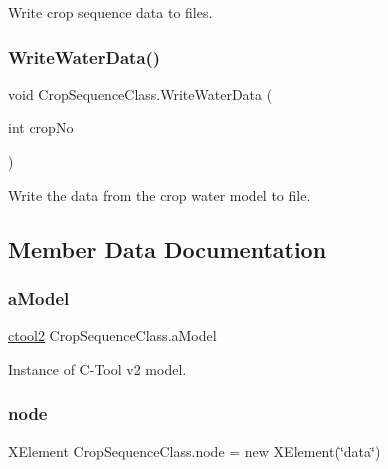 Write crop sequence data to files. 

\mbox{\label{class_crop_sequence_class_a51e6061d67d1d2a167fb2c3ae9ea843c}} 
\subsubsection{\texorpdfstring{WriteWaterData()}{WriteWaterData()}}
{\footnotesize\ttfamily void Crop\+Sequence\+Class.\+Write\+Water\+Data (\begin{DoxyParamCaption}\item[{int}]{crop\+No }\end{DoxyParamCaption})\hspace{0.3cm}{\ttfamily [inline]}}



Write the data from the crop water model to file. 



\subsection{Member Data Documentation}
\mbox{\label{class_crop_sequence_class_a46255236553411f929a97ecc1d68fb53}} 
\subsubsection{\texorpdfstring{aModel}{aModel}}
{\footnotesize\ttfamily \mbox{\hyperlink{classctool2}{ctool2}} Crop\+Sequence\+Class.\+a\+Model}



Instance of C-\/\+Tool v2 model. 

\mbox{\label{class_crop_sequence_class_aeb621b262d3b943df74d6d2fc5835868}} 
\subsubsection{\texorpdfstring{node}{node}}
{\footnotesize\ttfamily X\+Element Crop\+Sequence\+Class.\+node = new X\+Element(\char`\"{}data\char`\"{})}



